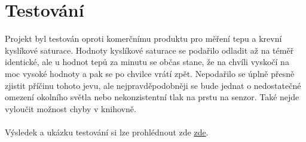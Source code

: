 \section{Testování} \label{testovani}
Projekt byl testován oproti komerčnímu produktu pro měření tepu a krevní kyslíkové saturace. Hodnoty kyslíkové saturace se podařilo odladit až na téměř identické, ale u hodnot tepů za minutu se občas stane, že na chvíli vyskočí na moc vysoké hodnoty a pak se po chvilce vrátí zpět. Nepodařilo se úplně přesně zjistit příčinu tohoto jevu, ale nejpravděpodobněji se bude jednat o nedostatečné omezení okolního světla nebo nekonzistentní tlak na prstu na senzor. Také nejde vyloučit možnost chyby v knihovně. \\ \\
Výsledek a ukázku testování si lze prohlédnout zde \href{https://youtube.com/shorts/q-xtbRGM5ro?feature=share}{zde}.